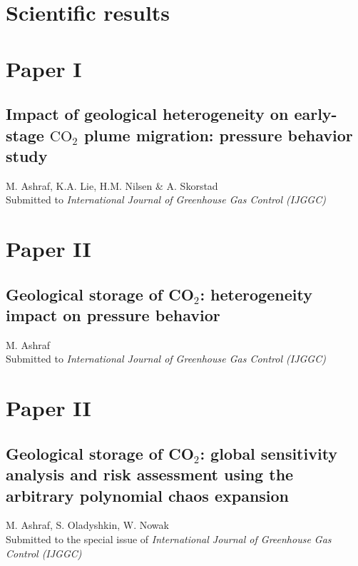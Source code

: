 \chapter{Scientific results}

\pagebreak

\chapter*{Paper I}
\section{Impact of geological heterogeneity on early-stage $\mbox{CO}_2$ plume
migration: pressure behavior study}

\noindent M. Ashraf, K.A. Lie, H.M. Nilsen \& A.
Skorstad\\

\noindent Submitted to \textit{International Journal of Greenhouse Gas Control
(IJGGC)}
\cleardoublepage




\chapter*{Paper II}
\section{Geological storage of CO$_2$: heterogeneity impact on pressure
behavior}

\noindent M. Ashraf\\

\noindent Submitted to \textit{International Journal of Greenhouse Gas Control
(IJGGC)}
\cleardoublepage



\chapter*{Paper II}
\section{Geological storage of CO$_2$: global sensitivity analysis
and risk assessment using the arbitrary polynomial
chaos expansion
}

\noindent M. Ashraf, S. Oladyshkin, W. Nowak\\

\noindent Submitted to the special issue of \textit{International Journal of
Greenhouse Gas Control (IJGGC)}
\cleardoublepage

